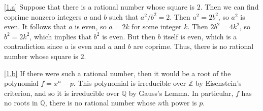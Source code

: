 \documentclass[a4paper,11pt]{ltjsarticle} %
\begin{document}
\begin{problem}
\end{problem}

\begin{solution}
\ref{1.a}
Suppose that there is a rational number whose square is $2$.
Then we can find coprime nonzero integers $a$ and $b$ such that $a^2 / b^2 = 2$.
Then $a^2 = 2 b^2$, so $a^2$ is even.
It follows that $a$ is even, so $a = 2 k$ for some integer $k$.
Then $2 b^2 = 4 k^2$, so $b^2 = 2 k^2$, which implies that $b^2$ is even.
But then $b$ itself is even, which is a contradiction since $a$ is even and $a$
and $b$ are coprime.
Thus, there is no rational number whose square is $2$.

\ref{1.b}
If there were such a rational number, then it would be a root of the polynomial
$f = x^n - p$.
This polynomial is irreducible over $\mathbb{Z}$ by Eisenstein's criterion, and
so it is irreducible over $\mathbb{Q}$ by Gauss's Lemma.
In particular, $f$ has no roots in $\mathbb Q$, there is no rational number
whose $n$th power is $p$.
\end{solution}
\end{document}
